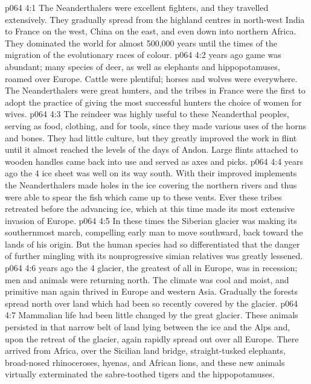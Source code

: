 \vs p064 4:1 The Neanderthalers were excellent fighters, and they travelled extensively. They gradually spread from the highland centres in north\hyp{}west India to France on the west, China on the east, and even down into northern Africa. They dominated the world for almost 500,000 years until the times of the migration of the evolutionary races of colour.
\vs p064 4:2 \pc {} years ago game was abundant; many species of deer, as well as elephants and hippopotamuses, roamed over Europe. Cattle were plentiful; horses and wolves were everywhere. The Neanderthalers were great hunters, and the tribes in France were the first to adopt the practice of giving the most successful hunters the choice of women for wives.
\vs p064 4:3 The reindeer was highly useful to these Neanderthal peoples, serving as food, clothing, and for tools, since they made various uses of the horns and bones. They had little culture, but they greatly improved the work in flint until it almost reached the levels of the days of Andon. Large flints attached to wooden handles came back into use and served as axes and picks.
\vs p064 4:4 \pc {} years ago the 4 ice sheet was well on its way south. With their improved implements the Neanderthalers made holes in the ice covering the northern rivers and thus were able to spear the fish which came up to these vents. Ever these tribes retreated before the advancing ice, which at this time made its most extensive invasion of Europe.
\vs p064 4:5 In these times the Siberian glacier was making its southernmost march, compelling early man to move southward, back toward the lands of his origin. But the human species had so differentiated that the danger of further mingling with its nonprogressive simian relatives was greatly lessened.
\vs p064 4:6 \pc {} years ago the 4 glacier, the greatest of all in Europe, was in recession; men and animals were returning north. The climate was cool and moist, and primitive man again thrived in Europe and western Asia. Gradually the forests spread north over land which had been so recently covered by the glacier.
\vs p064 4:7 Mammalian life had been little changed by the great glacier. These animals persisted in that narrow belt of land lying between the ice and the Alps and, upon the retreat of the glacier, again rapidly spread out over all Europe. There arrived from Africa, over the Sicilian land bridge, straight\hyp{}tusked elephants, broad\hyp{}nosed rhinoceroses, hyenas, and African lions, and these new animals virtually exterminated the sabre\hyp{}toothed tigers and the hippopotamuses.
